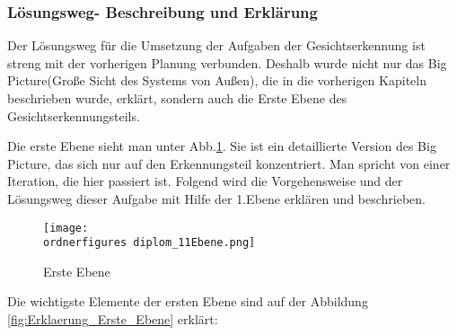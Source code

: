\subsubsection{Lösungsweg- Beschreibung und Erklärung}
Der Lösungsweg für die Umsetzung der Aufgaben der Gesichtserkennung ist streng mit der vorherigen Planung verbunden. Deshalb wurde nicht nur das Big Picture(Große Sicht des Systems von Außen), die in die vorherigen Kapiteln beschrieben wurde, erklärt, sondern auch die Erste Ebene des Gesichtserkennungsteils.


Die erste Ebene sieht man unter Abb.\ref{fig:Erste Ebene}. Sie ist ein detaillierte Version des Big Picture, das sich nur auf den Erkennungsteil konzentriert. Man spricht von einer Iteration, die hier passiert ist.  Folgend wird die Vorgehensweise und der Lösungsweg dieser Aufgabe mit Hilfe der 1.Ebene erklären und beschrieben.\\

\begin{figure}[H]
	\texttt{[image: \\ordnerfigures diplom\_11Ebene.png]}
	\caption{Erste Ebene}
	\label{fig:Erste Ebene}
\end{figure}

Die wichtigste Elemente der ersten Ebene sind auf der Abbildung \ref{fig:Erklaerung_Erste_Ebene} erklärt: \\

